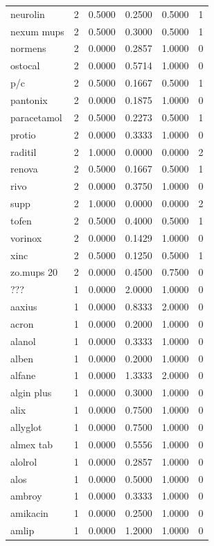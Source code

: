 \begin{longtable}{p{3.0cm}rrrrr}
neurolin & 2 & 0.5000 & 0.2500 & 0.5000 & 1 \\
nexum mups & 2 & 0.5000 & 0.3000 & 0.5000 & 1 \\
normens & 2 & 0.0000 & 0.2857 & 1.0000 & 0 \\
ostocal & 2 & 0.0000 & 0.5714 & 1.0000 & 0 \\
p/c & 2 & 0.5000 & 0.1667 & 0.5000 & 1 \\
pantonix & 2 & 0.0000 & 0.1875 & 1.0000 & 0 \\
paracetamol & 2 & 0.5000 & 0.2273 & 0.5000 & 1 \\
protio & 2 & 0.0000 & 0.3333 & 1.0000 & 0 \\
raditil & 2 & 1.0000 & 0.0000 & 0.0000 & 2 \\
renova & 2 & 0.5000 & 0.1667 & 0.5000 & 1 \\
rivo & 2 & 0.0000 & 0.3750 & 1.0000 & 0 \\
supp & 2 & 1.0000 & 0.0000 & 0.0000 & 2 \\
tofen & 2 & 0.5000 & 0.4000 & 0.5000 & 1 \\
vorinox & 2 & 0.0000 & 0.1429 & 1.0000 & 0 \\
xinc & 2 & 0.5000 & 0.1250 & 0.5000 & 1 \\
zo.mups 20 & 2 & 0.0000 & 0.4500 & 0.7500 & 0 \\
??? & 1 & 0.0000 & 2.0000 & 1.0000 & 0 \\
aaxius & 1 & 0.0000 & 0.8333 & 2.0000 & 0 \\
acron & 1 & 0.0000 & 0.2000 & 1.0000 & 0 \\
alanol & 1 & 0.0000 & 0.3333 & 1.0000 & 0 \\
alben & 1 & 0.0000 & 0.2000 & 1.0000 & 0 \\
alfane & 1 & 0.0000 & 1.3333 & 2.0000 & 0 \\
algin plus & 1 & 0.0000 & 0.3000 & 1.0000 & 0 \\
alix & 1 & 0.0000 & 0.7500 & 1.0000 & 0 \\
allyglot & 1 & 0.0000 & 0.7500 & 1.0000 & 0 \\
almex tab & 1 & 0.0000 & 0.5556 & 1.0000 & 0 \\
alolrol & 1 & 0.0000 & 0.2857 & 1.0000 & 0 \\
alos & 1 & 0.0000 & 0.5000 & 1.0000 & 0 \\
ambroy & 1 & 0.0000 & 0.3333 & 1.0000 & 0 \\
amikacin & 1 & 0.0000 & 0.2500 & 1.0000 & 0 \\
amlip & 1 & 0.0000 & 1.2000 & 1.0000 & 0 \\

\end{longtable}
